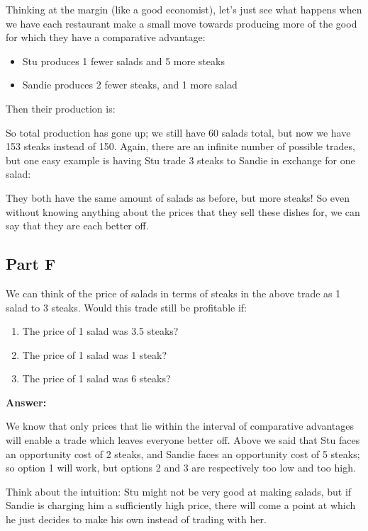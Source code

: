 \documentclass[12pt]{article}
\begin{document}
Thinking at the margin (like a good economist), let's just see what happens when we have each restaurant make a small move towards producing more of the good for which they have a comparative advantage:
    \begin{itemize}
        \item Stu produces 1 fewer salads and 5 more steaks
        \item Sandie produces 2 fewer steaks, and 1 more salad
    \end{itemize}
    
Then their production is:



So total production has gone up; we still have 60 salads total, but now we have 153 steaks instead of 150. Again, there are an infinite number of possible trades, but one easy example is having Stu trade 3 steaks to Sandie in exchange for one salad:



They both have the same amount of salads as before, but more steaks! So even without knowing anything about the prices that they sell these dishes for, we can say that they are each better off.

\subsection*{Part F}
We can think of the price of salads in terms of steaks in the above trade as 1 salad to 3 steaks. Would this trade still be profitable if:

\begin{enumerate}
    \item The price of 1 salad was 3.5 steaks?
    \item The price of 1 salad was 1 steak?
    \item The price of 1 salad was 6 steaks?
\end{enumerate}

\textbf{Answer:}

We know that only prices that lie within the interval of comparative advantages will enable a trade which leaves everyone better off. Above we said that Stu faces an opportunity cost of 2 steaks, and Sandie faces an opportunity cost of 5 steaks; so option 1 will work, but options 2 and 3 are respectively too low and too high.

\medskip

Think about the intuition: Stu might not be very good at making salads, but if Sandie is charging him a sufficiently high price, there will come a point at which he just decides to make his own instead of trading with her.
\end{document}
